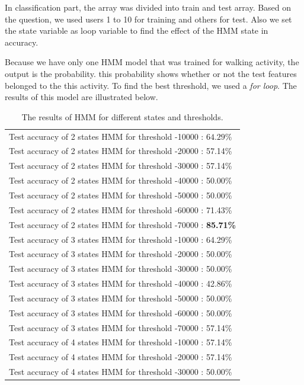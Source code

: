 In classification part, the array was divided into train and test array. Based on the question, we used users 1 to 10 for training and others for test. Also we set the state variable as loop variable to find the effect of the HMM state in accuracy.

Because we have only one HMM model that was trained for walking activity, the output is the probability. this probability shows whether or not the test features belonged to the this activity. To find the best threshold, we used a \emph{for loop}. The results of this model are illustrated below.  


\begin{table}[H]
\centering
\caption{The results of HMM for different states and thresholds.}
\label{tab:Q2_results}
\begin{tabular}{l}
\toprule
    Test accuracy of 2 states HMM for threshold -10000 : $64.29\%$ \\
    Test accuracy of 2 states HMM for threshold -20000 : 57.14\% \\
    Test accuracy of 2 states HMM for threshold -30000 : 57.14\% \\
    Test accuracy of 2 states HMM for threshold -40000 : 50.00\% \\
    Test accuracy of 2 states HMM for threshold -50000 : 50.00\% \\
    Test accuracy of 2 states HMM for threshold -60000 : 71.43\% \\
    Test accuracy of 2 states HMM for threshold -70000 : \textbf{85.71\%}\\
    Test accuracy of 3 states HMM for threshold -10000 : 64.29\% \\
    Test accuracy of 3 states HMM for threshold -20000 : 50.00\% \\
    Test accuracy of 3 states HMM for threshold -30000 : 50.00\% \\
    Test accuracy of 3 states HMM for threshold -40000 : 42.86\% \\
    Test accuracy of 3 states HMM for threshold -50000 : 50.00\% \\
    Test accuracy of 3 states HMM for threshold -60000 : 50.00\% \\
    Test accuracy of 3 states HMM for threshold -70000 : 57.14\% \\
    Test accuracy of 4 states HMM for threshold -10000 : 57.14\% \\
    Test accuracy of 4 states HMM for threshold -20000 : 57.14\% \\
    Test accuracy of 4 states HMM for threshold -30000 : 50.00\% \\

\end{tabular}
\end{table}
